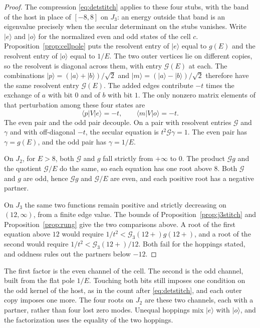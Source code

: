 \begin{proof}
The compression \eqref{eq:detstitch} applies to these four stubs, with the
band of the host in place of \([-8,8]\) on \(J_3\): an energy outside that
band is an eigenvalue precisely when the secular determinant on the stubs
vanishes.
Write \(|e\rangle\) and \(|o\rangle\) for the normalized even and odd states of
the cell \(c\).
Proposition~\ref{prop:cellpole} puts the resolvent entry of \(|e\rangle\)
equal to \(g(E)\) and the resolvent entry of \(|o\rangle\) equal to \(1/E\).
The two outer vertices lie on different copies, so the resolvent is diagonal
across them, with entry \(\mathcal{G}(E)\) at each.
The combinations \(|p\rangle=(|a\rangle+|b\rangle)/\sqrt{2}\) and
\(|m\rangle=(|a\rangle-|b\rangle)/\sqrt{2}\) therefore have the same
resolvent entry \(\mathcal{G}(E)\).
The added edges contribute
\(-t\) times the exchange of \(a\) with bit \(0\) and of \(b\) with bit \(1\).
The only nonzero matrix elements of that perturbation among these four
states are
\[
\langle p|V|e\rangle=-t,
\qquad
\langle m|V|o\rangle=-t.
\]
The even pair and the odd pair decouple.
On a pair with resolvent entries \(\mathcal{G}\) and \(\gamma\) and with
off-diagonal \(-t\), the secular equation is \(t^2\mathcal{G}\gamma=1\).
The even pair has \(\gamma=g(E)\), and the odd pair has \(\gamma=1/E\).

On \(J_2\), for \(E>8\), both \(\mathcal{G}\) and \(g\) fall strictly from
\(+\infty\) to \(0\).
The product \(\mathcal{G}g\) and the quotient \(\mathcal{G}/E\) do the same,
so each equation has one root above \(8\).
Both \(\mathcal{G}\) and \(g\) are odd, hence \(\mathcal{G}g\) and
\(\mathcal{G}/E\) are even, and each positive root has a negative partner.

On \(J_3\) the same two functions remain positive and strictly decreasing on
\((12,\infty)\), from a finite edge value.
The bounds of Proposition~\ref{prop:j3stitch} and
Proposition~\ref{prop:rung} give the two comparisons above.
A root of the first equation above \(12\) would require
\(1/t^2<\mathcal{G}_3(12+)g(12+)\), and a root of the second would require
\(1/t^2<\mathcal{G}_3(12+)/12\).
Both fail for the hoppings stated, and oddness rules out the partners
below \(-12\).
\end{proof}

The first factor is the even channel of the cell.
The second is the odd channel, built from the flat pole \(1/E\).
Touching both bits still imposes one condition on the odd kernel of the
host, as in the count after \eqref{eq:detstitch}, and each outer copy
imposes one more.
The four roots on \(J_2\) are these two channels, each with a partner, rather
than four lost zero modes.
Unequal hoppings mix \(|e\rangle\) with \(|o\rangle\), and the factorization
uses the equality of the two hoppings.

